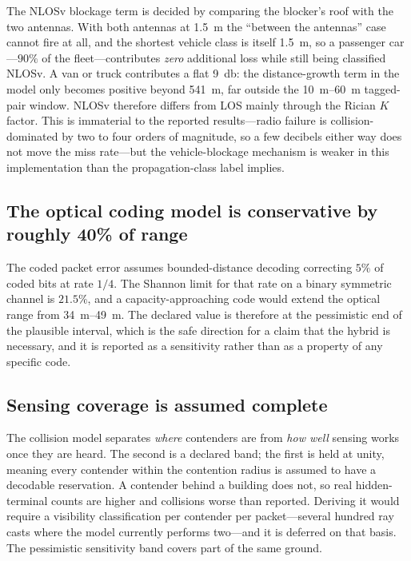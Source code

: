 \documentclass[conference]{IEEEtran}
\begin{document}
The NLOSv blockage term is decided by comparing the blocker's roof with the two
antennas. With both antennas at \SI{1.5}{\meter} the ``between the antennas''
case cannot fire at all, and the shortest vehicle class is itself
\SI{1.5}{\meter}, so a passenger car---$90\%$ of the fleet---contributes
\emph{zero} additional loss while still being classified NLOSv. A van or truck
contributes a flat \SI{9}{\decibel}: the distance-growth term in the model only
becomes positive beyond \SI{541}{\meter}, far outside the
\SIrange{10}{60}{\meter} tagged-pair window. NLOSv therefore differs from LOS
mainly through the Rician $K$ factor. This is immaterial to the reported
results---radio failure is collision-dominated by two to four orders of
magnitude, so a few decibels either way does not move the miss rate---but the
vehicle-blockage mechanism is weaker in this implementation than the
propagation-class label implies.

\subsection{The optical coding model is conservative by roughly 40\% of range}

The coded packet error assumes bounded-distance decoding correcting $5\%$ of
coded bits at rate $1/4$. The Shannon limit for that rate on a binary symmetric
channel is $21.5\%$, and a capacity-approaching code would extend the optical
range from \SIrange{34}{49}{\meter}. The declared value is therefore at the
pessimistic end of the plausible interval, which is the safe direction for a
claim that the hybrid is necessary, and it is reported as a sensitivity rather
than as a property of any specific code.

\subsection{Sensing coverage is assumed complete}

The collision model separates \emph{where} contenders are from \emph{how well}
sensing works once they are heard. The second is a declared band; the first is
held at unity, meaning every contender within the contention radius is assumed
to have a decodable reservation. A contender behind a building does not, so real
hidden-terminal counts are higher and collisions worse than reported. Deriving
it would require a visibility classification per contender per packet---several
hundred ray casts where the model currently performs two---and it is deferred on
that basis. The pessimistic sensitivity band covers part of the same ground.
\end{document}
